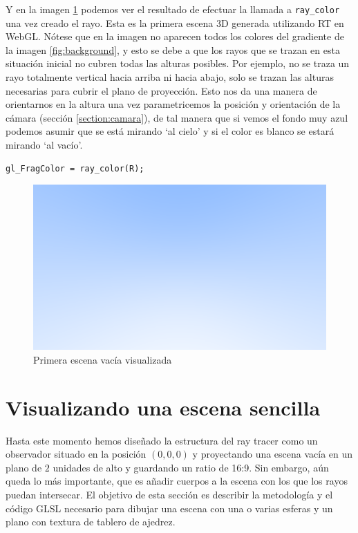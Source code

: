 Y en la imagen \ref{fig:first-render} podemos ver el resultado de efectuar la llamada a \verb|ray_color| una vez creado el rayo. Esta es la primera escena 3D generada utilizando RT en WebGL. Nótese que en la imagen no aparecen todos los colores del gradiente de la imagen \ref{fig:background}, y esto se debe a que los rayos que se trazan en esta situación inicial no cubren todas las alturas posibles. Por ejemplo, no se traza un rayo totalmente vertical hacia arriba ni hacia abajo, solo se trazan las alturas necesarias para cubrir el plano de proyección. Esto nos da una manera de orientarnos en la altura una vez parametricemos la posición y orientación de la cámara (sección \ref{section:camara}), de tal manera que si vemos el fondo muy azul podemos asumir que se está mirando `al cielo' y si el color es blanco se estará mirando `al vacío'. 

\begin{lstlisting}
gl_FragColor = ray_color(R);
\end{lstlisting}

\begin{figure} [ht]
    \centering
    \includegraphics[scale = 0.35]{img/C7/first-render.png}
    \caption{Primera escena vacía visualizada}
    \label{fig:first-render}
\end{figure}

\section{Visualizando una escena sencilla}
\label{section:escena}

Hasta este momento hemos diseñado la estructura del ray tracer como un observador situado en la posición $(0, 0,0)$ y proyectando una escena vacía en un plano de $2$ unidades de alto y guardando un ratio de 16:9. Sin embargo, aún queda lo más importante, que es añadir cuerpos a la escena con los que los rayos puedan intersecar. El objetivo de esta sección es describir la metodología y el código GLSL necesario para dibujar una escena con una o varias esferas y un plano con textura de tablero de ajedrez. 

